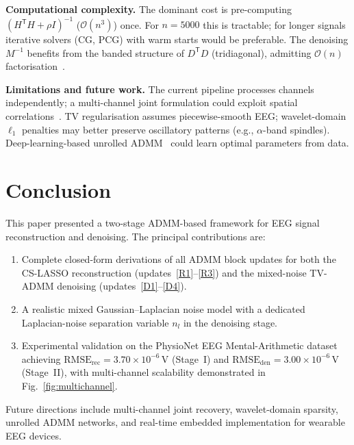 \documentclass[journal,twoside,10pt]{IEEEtran}
\newcommand{\T}{^{\mathsf{T}}}
\begin{document}
\textbf{Computational complexity.}  The dominant cost is pre-computing $(H\T H+\rho I)^{-1}$
($\mathcal{O}(n^3)$) once.  For $n=5000$ this is tractable; for longer signals iterative solvers (CG,
PCG) with warm starts would be preferable.  The denoising $M^{-1}$ benefits from the banded structure
of $D\T D$ (tridiagonal), admitting $\mathcal{O}(n)$ factorisation~\cite{selesnick2012}.

\textbf{Limitations and future work.}  The current pipeline processes channels independently; a
multi-channel joint formulation could exploit spatial correlations~\cite{zhu2021}.  TV regularisation assumes
piecewise-smooth EEG; wavelet-domain $\ell_1$ penalties may better preserve oscillatory patterns (e.g.,
$\alpha$-band spindles).  Deep-learning-based unrolled ADMM~\cite{monga2021} could learn optimal
parameters from data.

\section{Conclusion}
\label{sec:conclusion}

This paper presented a two-stage ADMM-based framework for EEG signal reconstruction and denoising.
The principal contributions are:
\begin{enumerate}
  \item Complete closed-form derivations of all ADMM block updates for both the CS-LASSO
        reconstruction (updates~\eqref{R1}--\eqref{R3}) and the mixed-noise TV-ADMM denoising
        (updates~\eqref{D1}--\eqref{D4}).
  \item A realistic mixed Gaussian--Laplacian noise model with a dedicated Laplacian-noise separation
        variable $n_l$ in the denoising stage.
  \item Experimental validation on the PhysioNet EEG Mental-Arithmetic dataset achieving
        $\text{RMSE}_\mathrm{rec}=3.70\times10^{-6}$\,V (Stage~I) and
        $\text{RMSE}_\mathrm{den}=3.00\times10^{-6}$\,V (Stage~II), with multi-channel scalability
        demonstrated in Fig.~\ref{fig:multichannel}.
\end{enumerate}

Future directions include multi-channel joint recovery, wavelet-domain sparsity, unrolled ADMM networks,
and real-time embedded implementation for wearable EEG devices.

\end{document}
